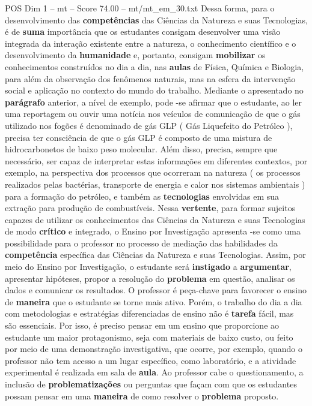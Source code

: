 \begin{textsample}{POS Dim 1 – mt – Score 74.00 – mt/mt\_em\_30.txt}
Dessa forma, para o desenvolvimento das \textbf{competências} das Ciências da Natureza e suas Tecnologias, é de \textbf{suma} importância que os estudantes consigam desenvolver uma visão integrada da interação existente entre a natureza, o conhecimento científico e o desenvolvimento da \textbf{humanidade} e, portanto, consigam \textbf{mobilizar} os conhecimentos construídos no dia a dia, nas \textbf{aulas} de Física, Química e Biologia, para além da observação dos fenômenos naturais, mas na esfera da intervenção social e aplicação no contexto do mundo do trabalho.
Mediante o apresentado no \textbf{parágrafo} anterior, a nível de exemplo, pode -se afirmar que o estudante, ao ler uma reportagem ou ouvir uma notícia nos veículos de comunicação de que o gás utilizado nos fogões é denominado de gás GLP ( Gás Liquefeito do Petróleo ), precisa ter consciência de que o gás GLP é composto de uma mistura de hidrocarbonetos de baixo peso molecular.
Além disso, precisa, sempre que necessário, ser capaz de interpretar estas informações em diferentes contextos, por exemplo, na perspectiva dos processos que ocorreram na natureza ( os processos realizados pelas bactérias, transporte de energia e calor nos sistemas ambientais ) para a formação do petróleo, e também as \textbf{tecnologias} envolvidas em sua extração para produção de combustíveis.
Nessa \textbf{vertente}, para formar sujeitos capazes de utilizar os conhecimentos das Ciências da Natureza e suas Tecnologias de modo \textbf{crítico} e integrado, o Ensino por Investigação apresenta -se como uma possibilidade para o professor no processo de mediação das habilidades da \textbf{competência} específica das Ciências da Natureza e suas Tecnologias.
Assim, por meio do Ensino por Investigação, o estudante será \textbf{instigado} a \textbf{argumentar}, apresentar hipóteses, propor a resolução do \textbf{problema} em questão, analisar os dados e comunicar os resultados.
O professor é peça-chave para favorecer o ensino de \textbf{maneira} que o estudante se torne mais ativo.
Porém, o trabalho do dia a dia com metodologias e estratégias diferenciadas de ensino não é \textbf{tarefa} fácil, mas são essenciais.
Por isso, é preciso pensar em um ensino que proporcione ao estudante um maior protagonismo, seja com materiais de baixo custo, ou feito por meio de uma demonstração investigativa, que ocorre, por exemplo, quando o professor não tem acesso a um lugar específico, como laboratório, e a atividade experimental é realizada em sala de \textbf{aula}.
Ao professor cabe o questionamento, a inclusão de \textbf{problematizações} ou perguntas que façam com que os estudantes possam pensar em uma \textbf{maneira} de como resolver o \textbf{problema} proposto.

\end{textsample}
